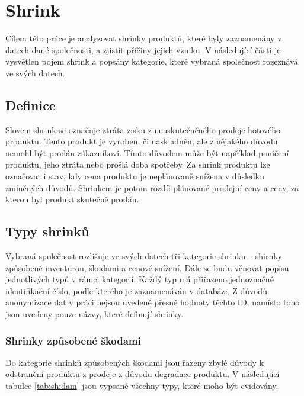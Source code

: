 \chapter{Shrink}

Cílem této práce je analyzovat shrinky produktů, které byly zaznamenány v datech dané společnosti, a zjistit příčiny jejich vzniku. V následující části je vysvětlen pojem shrink a popsány kategorie, které vybraná společnost rozeznává ve svých datech.

\section{Definice}

Slovem shrink se označuje ztráta zisku z neuskutečněného prodeje hotového produktu. Tento produkt je vyroben, či naskladněn, ale z nějakého důvodu nemohl být prodán zákazníkovi. Tímto důvodem může být například poničení produktu, jeho ztráta nebo prošlá doba spotřeby. Za shrink produktu lze označovat i stav, kdy cena produktu je neplánovaně snížena v důsledku zmíněných důvodů. Shrinkem je potom rozdíl plánované prodejní ceny a ceny, za kterou byl produkt skutečně prodán.\cite{bib:DefShrink}



\section{Typy shrinků}
\label{sec:shrinkyTypy}

Vybraná společnost rozlišuje ve svých datech tři kategorie shrinku -- shirnky způsobené inventurou, škodami a cenové snížení. Dále se budu věnovat popisu jednotlivých typů v rámci kategorií. Každý typ má přiřazeno jednoznačné identifikační číslo, podle kterého je zaznamenáván v databázi. Z důvodů anonymizace dat v práci nejsou uvedené přesné hodnoty těchto ID, namísto toho jsou uvedeny pouze názvy, které definují shrinky.

\subsection*{Shrinky způsobené škodami}

Do kategorie shrinků způsobených škodami jsou řazeny zbylé důvody k odstranění produktu z prodeje z důvodu degradace produktu. V následující tabulce \ref{tab:sh:dam} jsou vypsané všechny typy, které moho být evidovány.

